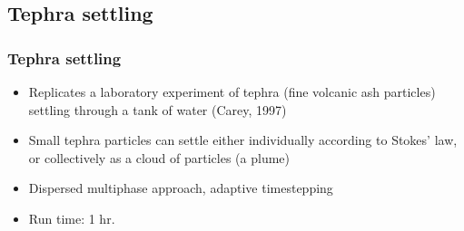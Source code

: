 \subsection{Tephra settling}

\begin{frame}
  \frametitle{Tephra settling}
  \begin{itemize}
  \item Replicates a laboratory experiment of tephra (fine volcanic ash particles) settling through a tank of water
    (Carey, 1997)
  \item Small tephra particles can settle either individually according to Stokes' law, or collectively as a cloud of particles (a plume)
  \item Dispersed multiphase approach, adaptive timestepping
  \item Run time: 1 hr.
  \end{itemize}
\end{frame}


